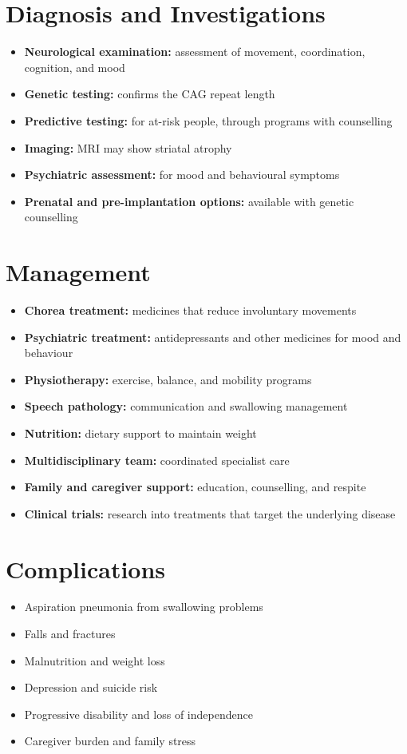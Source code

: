 \section*{Diagnosis and Investigations}
\begin{itemize}
    \item \textbf{Neurological examination:} assessment of movement, coordination, cognition, and mood
    \item \textbf{Genetic testing:} confirms the CAG repeat length
    \item \textbf{Predictive testing:} for at-risk people, through programs with counselling
    \item \textbf{Imaging:} MRI may show striatal atrophy
    \item \textbf{Psychiatric assessment:} for mood and behavioural symptoms
    \item \textbf{Prenatal and pre-implantation options:} available with genetic counselling
\end{itemize}

\section*{Management}
\begin{itemize}
    \item \textbf{Chorea treatment:} medicines that reduce involuntary movements
    \item \textbf{Psychiatric treatment:} antidepressants and other medicines for mood and behaviour
    \item \textbf{Physiotherapy:} exercise, balance, and mobility programs
    \item \textbf{Speech pathology:} communication and swallowing management
    \item \textbf{Nutrition:} dietary support to maintain weight
    \item \textbf{Multidisciplinary team:} coordinated specialist care
    \item \textbf{Family and caregiver support:} education, counselling, and respite
    \item \textbf{Clinical trials:} research into treatments that target the underlying disease
\end{itemize}

\section*{Complications}
\begin{itemize}
    \item Aspiration pneumonia from swallowing problems
    \item Falls and fractures
    \item Malnutrition and weight loss
    \item Depression and suicide risk
    \item Progressive disability and loss of independence
    \item Caregiver burden and family stress
\end{itemize}

